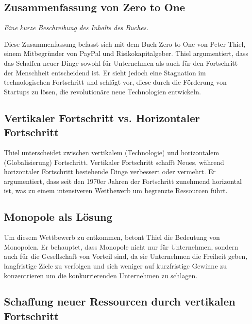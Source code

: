 \documentclass[10pt]{article}
\begin{document}
\tableofcontents
\newpage


\begin{center}
\section*{Zusammenfassung von Zero to One}
\textit{Eine kurze Beschreibung des Inhalts des Buches.}
\end{center}

Diese Zusammenfassung befasst sich mit dem Buch Zero to One von Peter Thiel, einem Mitbegründer von PayPal und Risikokapitalgeber. Thiel argumentiert, dass das Schaffen neuer Dinge sowohl für Unternehmen als auch für den Fortschritt der Menschheit entscheidend ist. Er sieht jedoch eine Stagnation im technologischen Fortschritt und schlägt vor, diese durch die Förderung von Startups zu lösen, die revolutionäre neue Technologien entwickeln.

\subsection*{Vertikaler Fortschritt vs. Horizontaler Fortschritt}

Thiel unterscheidet zwischen vertikalem (Technologie) und horizontalem (Globalisierung) Fortschritt. Vertikaler Fortschritt schafft Neues, während horizontaler Fortschritt bestehende Dinge verbessert oder vermehrt. Er argumentiert, dass seit den 1970er Jahren der Fortschritt zunehmend horizontal ist, was zu einem intensiveren Wettbewerb um begrenzte Ressourcen führt.

\subsection*{Monopole als Lösung}

Um diesem Wettbewerb zu entkommen, betont Thiel die Bedeutung von Monopolen. Er behauptet, dass Monopole nicht nur für Unternehmen, sondern auch für die Gesellschaft von Vorteil sind, da sie Unternehmen die Freiheit geben, langfristige Ziele zu verfolgen und sich weniger auf kurzfristige Gewinne zu konzentrieren um die konkurrierenden Unternehmen zu schlagen.

\subsection*{Schaffung neuer Ressourcen durch vertikalen Fortschritt}
\end{document}
